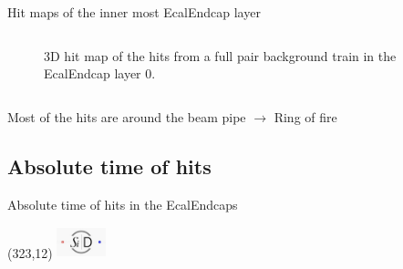 \documentclass[xcolor={dvipsnames}]{beamer}
\newcommand{\sidlogo}{
  \setlength{\TPHorizModule}{1pt}
  \setlength{\TPVertModule}{1pt}
  \begin{textblock}{1}(323,12)
   \includegraphics[width=40pt,height=26pt]{figures/SiD.jpeg}
  \end{textblock}
  }
\begin{document}
\begin{frame}{Hit maps of the inner most EcalEndcap layer}
\begin{columns}[T]
\begin{column}[b]{0.5\textwidth}
\begin{figure}
\caption{\small 3D hit map of the hits from a full pair background train in the EcalEndcap layer 0.}
\end{figure}
\end{column}
\end{columns}
Most of the hits are around the beam pipe $\rightarrow$ Ring of fire
\end{frame}

\subsection{Absolute time of hits}
\begin{frame}{Absolute time of hits in the EcalEndcaps}
\sidlogo
{}
\end{frame}
\end{document}
